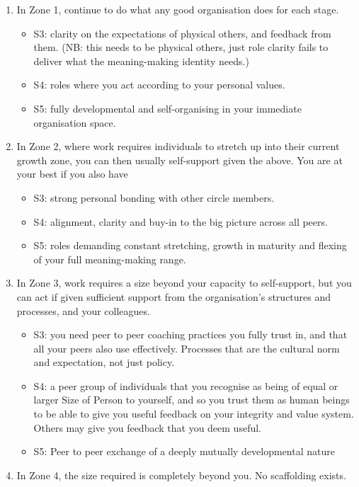 \begin{enumerate}
\item In Zone 1, continue to do what any good organisation does for each stage.                  


\begin{itemize}
\item S3: clarity on the expectations of physical others, and feedback from them. (NB: this needs to be physical others, just role clarity fails to deliver what the meaning\hyp{}making identity needs.)
\item S4: roles where you act according to your personal values. 
\item S5: fully developmental and self-organising in your immediate organisation space.
\end{itemize}


\item In Zone 2, where work requires individuals to stretch up into their current growth zone, you can then usually self-support given the above. You are at your best if you also have


\begin{itemize}
\item S3: strong personal bonding with other circle members.
\item S4: alignment, clarity and buy-in to the big picture across all peers. 
\item S5: roles demanding constant stretching, growth in maturity and flexing of your full meaning\hyp{}making range.
\end{itemize}


\item In Zone 3, work requires a size beyond your capacity to self-support, but you can act if given sufficient support from the organisation's structures and processes, and your colleagues. 


\begin{itemize}
\item S3: you need peer to peer coaching practices you fully trust in, and that all your peers also use effectively. Processes that are the cultural norm and expectation, not just policy.
\item S4: a peer group of individuals that you recognise as being of equal or larger Size of Person to yourself, and so you trust them as human beings to be able to give you useful feedback on your integrity and value system. Others may give you feedback that you deem useful.
\item S5: Peer to peer exchange of a deeply mutually developmental nature
\end{itemize}


\item In Zone 4, the size required is completely beyond you. No scaffolding exists. 
\end{enumerate}


